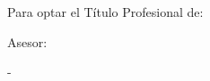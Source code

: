 \begin{titlepage}
{\begin{adjustwidth}{0.52\textwidth}{}
        \vfill\vspace{0.3cm}\par
        
        {
        \noindent Para optar el Título Profesional de:\par
        \noindent \VarGrado \par
        }
        
        \vfill\vspace{0.3cm}\par
        
        {
        \noindent Asesor:\par
        \noindent \VarAsesor \par
        }
    \end{adjustwidth}
    }

    \vfill\vspace{0.3cm}

    {
    
    \begin{center}
        \fontsize{12}{10}\selectfont
        \VarCiudad - \VarPais\par
        \VarAnio\par
    \end{center}
    }
\end{titlepage}
